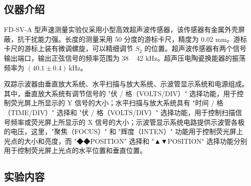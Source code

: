 \documentclass[12pt,a4paper]{article}
\begin{document}
\subsection*{仪器介绍}

FD-SV-A 型声速测量实验仪采用小型高效超声波传感器，该传感器有金属外壳屏蔽，抗干扰能力强。长度的测量采用 50 分度的游标卡尺，精度为 0.02 mm。游标卡尺的游标上装有微调螺旋，可以精细调节 $S_2$ 的位置。超声波传感器有两个信号输出端口，输出正弦信号的频率范围为 38 ~ 42 kHz。超声压电陶瓷换能器的振荡频率为 $(40.1\pm0.4)\,\text{kHz}$。

双踪示波器由垂直放大系统、水平扫描与放大系统、示波管显示系统和电源组成。其中，垂直放大系统有调节信号的 "伏 / 格（VOLTS/DIV）" 选择功能，用于控制荧光屏上所显示的 Y 信号的大小；水平扫描与放大系统具有 "时间 / 格（TIME/DIV）" 选择和 "伏 / 格（VOLTS/DIV）" 选择功能，用于控制扫描信号频率或荧光屏上所显示的 X 信号的大小；示波管显示系统电路提供示波管各极的电压，这里，"聚焦（FOCUS）" 和 "辉度（INTEN）" 功能用于控制荧光屏上光点的大小和亮度，而 "◆◆POSITION" 选择和 "▲▼POSITION" 选择功能分别用于控制荧光屏上光点的水平位置和垂直位置。

\subsection*{实验内容}
\end{document}
